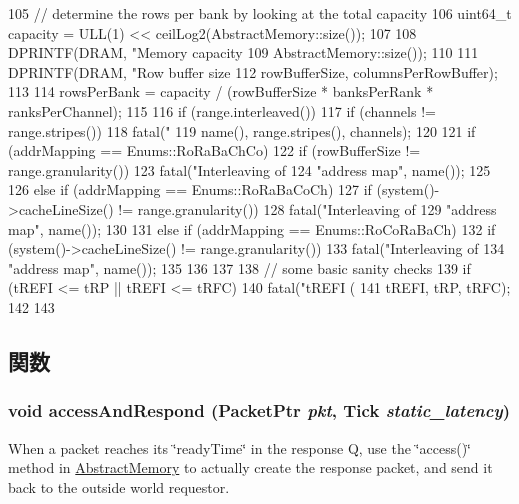 \begin{DoxyCode}
{105     // determine the rows per bank by looking at the total capacity
106     uint64_t capacity = ULL(1) << ceilLog2(AbstractMemory::size());
107 
108     DPRINTF(DRAM, "Memory capacity %
109             AbstractMemory::size());
110 
111     DPRINTF(DRAM, "Row buffer size %
112             rowBufferSize, columnsPerRowBuffer);
113 
114     rowsPerBank = capacity / (rowBufferSize * banksPerRank * ranksPerChannel);
115 
116     if (range.interleaved()) {
117         if (channels != range.stripes())
118             fatal("%
119                   name(), range.stripes(), channels);
120 
121         if (addrMapping == Enums::RoRaBaChCo) {
122             if (rowBufferSize != range.granularity()) {
123                 fatal("Interleaving of %
124                       "address map\n", name());
125             }
126         } else if (addrMapping == Enums::RoRaBaCoCh) {
127             if (system()->cacheLineSize() != range.granularity()) {
128                 fatal("Interleaving of %
129                       "address map\n", name());
130             }
131         } else if (addrMapping == Enums::RoCoRaBaCh) {
132             if (system()->cacheLineSize() != range.granularity())
133                 fatal("Interleaving of %
134                       "address map\n", name());
135         }
136     }
137 
138     // some basic sanity checks
139     if (tREFI <= tRP || tREFI <= tRFC) {
140         fatal("tREFI (%
141               tREFI, tRP, tRFC);
142     }
143 }

\end{DoxyCode}


\subsection{関数}
\hypertarget{classDRAMCtrl_aa10846589da1206d0047f6b82c2814e4}{
\subsubsection[{accessAndRespond}]{\setlength{\rightskip}{0pt plus 5cm}void accessAndRespond ({\bf PacketPtr} {\em pkt}, \/  {\bf Tick} {\em static\_\-latency})}}
\label{classDRAMCtrl_aa10846589da1206d0047f6b82c2814e4}
When a packet reaches its \char`\"{}readyTime\char`\"{} in the response Q, use the \char`\"{}access()\char`\"{} method in \hyperlink{classAbstractMemory}{AbstractMemory} to actually create the response packet, and send it back to the outside world requestor.



